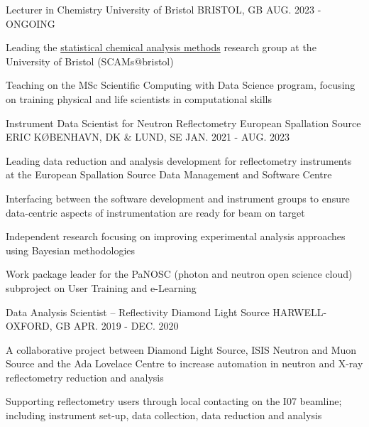 \begin{cventries}
  \cventry
    {Lecturer in Chemistry}
    {University of Bristol}
    {BRISTOL, GB}
    {AUG. 2023 - ONGOING}
    {
      \begin{cvitems}
        \item {Leading the \href{https://scams-research.github.io}{statistical chemical analysis methods} research group at the University of Bristol (SCAMs@bristol)}
        \item {Teaching on the MSc Scientific Computing with Data Science program, focusing on training physical and life scientists in computational skills}
      \end{cvitems}
    }
  \cventry
    {Instrument Data Scientist for Neutron Reflectometry}
    {European Spallation Source ERIC}
    {K\O BENHAVN, DK \& LUND, SE}
    {JAN. 2021 - AUG. 2023}
    {
      \begin{cvitems}
        \item {Leading data reduction and analysis development for reflectometry instruments at the European Spallation Source Data Management and Software Centre}
        \item {Interfacing between the software development and instrument groups to ensure data-centric aspects of instrumentation are ready for beam on target}
        \item {Independent research focusing on improving experimental analysis approaches using Bayesian methodologies}
        \item {Work package leader for the PaNOSC (photon and neutron open science cloud) subproject on User Training and e-Learning}
      \end{cvitems}
    }
  \cventry
    {Data Analysis Scientist -- Reflectivity}
    {Diamond Light Source}
    {HARWELL-OXFORD, GB}
    {APR. 2019 - DEC. 2020}
    {
      \begin{cvitems}
        \item {A collaborative project between Diamond Light Source, ISIS Neutron and Muon Source and the Ada Lovelace Centre to increase automation in neutron and X-ray reflectometry reduction and analysis}
        \item {Supporting reflectometry users through local contacting on the I07 beamline; including instrument set-up, data collection, data reduction and analysis}
      \end{cvitems}
    }
\end{cventries}
